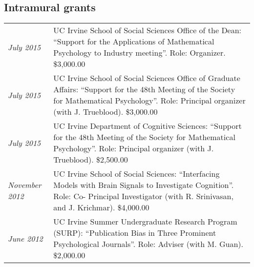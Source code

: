 \documentclass[]{article}
\def\slist{\begin{longtable}{>{\em}p{1.25in} p{5.0in}}}
\def\elist{\end{longtable}}
\begin{document}
\subsection*{Intramural grants}
\slist
  July 2015      & UC Irvine School of Social Sciences Office of the
  				   Dean: ``Support for the Applications of
                   Mathematical Psychology to Industry meeting''.
                   Role: Organizer. 
                   \$3,000.00\\
  July 2015      & UC Irvine School of Social Sciences Office of
  				   Graduate Affairs: ``Support for the 48th Meeting
                   of the Society for Mathematical Psychology''. 
                   Role: Principal organizer (with J. Trueblood).
                   \$3,000.00\\
  July 2015      & UC Irvine Department of Cognitive Sciences:
  				   ``Support for the 48th Meeting of the Society for
                   Mathematical Psychology''.  
                   Role: Principal organizer (with J. Trueblood). 
                   \$2,500.00\\
  November 2012  & UC Irvine School of Social Sciences:
  				   ``Interfacing Models with Brain Signals to
                   Investigate Cognition''. 
                   Role: Co- Principal Investigator (with 
                   R. Srinivasan, and J. Krichmar).
                   \$4,000.00\\
  June 2012      & UC Irvine Summer Undergraduate Research Program
  				   (SURP): ``Publication Bias in Three Prominent
                   Psychological Journals''. 
                   Role: Adviser (with M. Guan).
                   \$2,000.00\\
\elist
\end{document}
